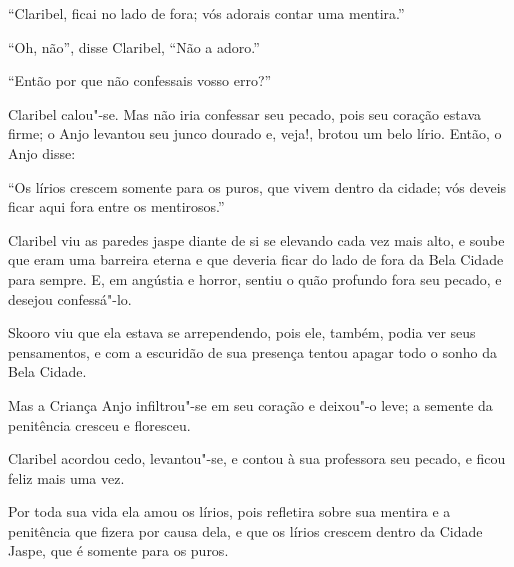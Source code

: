 ``Claribel, ficai no lado de fora; vós adorais contar uma mentira.''

``Oh, não'', disse Claribel, ``Não a adoro.''

``Então por que não confessais vosso erro?''

Claribel calou"-se. Mas não iria confessar seu pecado, pois seu
coração estava firme; o Anjo levantou seu junco dourado e, veja!, brotou
um belo lírio. Então, o Anjo disse:

``Os lírios crescem somente para os puros, que vivem dentro da cidade;
vós deveis ficar aqui fora entre os mentirosos.''

Claribel viu as paredes jaspe diante de si se elevando cada vez mais
alto, e soube que eram uma barreira eterna e que deveria
ficar do lado de fora da Bela Cidade para sempre. E, em angústia e horror,
sentiu o quão profundo fora seu pecado, e desejou confessá"-lo.

Skooro viu que ela estava se arrependendo, pois ele, também, podia ver
seus pensamentos, e com a escuridão de sua presença tentou apagar todo o
sonho da Bela Cidade.

Mas a Criança Anjo infiltrou"-se em seu coração e deixou"-o leve; a
semente da penitência cresceu e floresceu.

Claribel acordou cedo, levantou"-se, e contou à sua professora seu
pecado, e ficou feliz mais uma vez.

Por toda sua vida ela amou os lírios, pois refletira sobre sua mentira e
a penitência que fizera por causa dela, e que os lírios crescem dentro da Cidade
Jaspe, que é somente para os puros.


